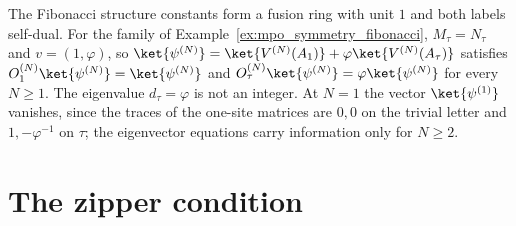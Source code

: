 \begin{example}%
    \label{ex:mposym_fibonacci_boundary_state}
    \leanok
    The Fibonacci structure constants form a fusion ring with unit $1$ and
    both labels self-dual. For the family of
    Example~\ref{ex:mpo_symmetry_fibonacci}, $M_\tau=N_\tau$ and
    $v=(1,\varphi)$, so
    $\ket{\psi^{(N)}}=\ket{V^{(N)}(A_1)}+\varphi\ket{V^{(N)}(A_\tau)}$
    satisfies $O_1^{(N)}\ket{\psi^{(N)}}=\ket{\psi^{(N)}}$ and
    $O_\tau^{(N)}\ket{\psi^{(N)}}=\varphi\ket{\psi^{(N)}}$ for every
    $N\geq1$. The eigenvalue $d_\tau=\varphi$ is not an integer. At
    $N=1$ the vector $\ket{\psi^{(1)}}$ vanishes, since the traces of the one-site
    matrices are $0,0$ on the trivial letter and $1,-\varphi^{-1}$ on $\tau$;
    the eigenvector equations carry information only for $N\geq2$.
\end{example}

\section{The zipper condition}%
\label{sec:mposym_zipper}

